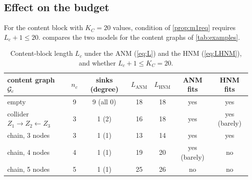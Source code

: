 \subsection{Effect on the budget}
For the content block with $K_C=20$ values, condition  of \cref{prop:m1req} 
requires $L_c+1\le20$.  compares the two models for the content graphs of 
\cref{tab:examples}.

\begin{table}[ht]
\centering
\caption{Content-block length $L_c$ under the ANM (\cref{eq:L}) and the HNM (\cref{eq:LHNM}), and whether
$L_c+1\le K_C=20$.}
\label{tab:hnm}
\begin{tabular}{@{}lcccccc@{}}
\toprule
content graph $\mathcal{G}_c$ & $n_c$ & sinks (degree) & $L_{\mathrm{ANM}}$ & $L_{\mathrm{HNM}}$ & ANM fits & HNM fits\\
\midrule
empty                              & 9 & 9 (all 0) & 18 & 18 & yes & yes\\
collider $Z_1\to Z_2\leftarrow Z_3$ & 3 & 1 (2) & 16 & 18 & yes & yes (barely)\\
chain, 3 nodes                     & 3 & 1 (1) & 13 & 14 & yes & yes\\
chain, 4 nodes                     & 4 & 1 (1) & 19 & 20 & yes (barely) & no\\
chain, 5 nodes                     & 5 & 1 (1) & 25 & 26 & no & no\\
\bottomrule
\end{tabular}
\end{table}

